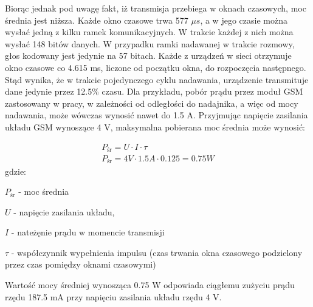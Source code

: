 Biorąc jednak pod uwagę fakt, iż transmisja przebiega w oknach czasowych, moc średnia jest niższa. Każde okno czasowe trwa 577 $\mu s$, a w jego czasie można wysłać jedną z kilku ramek komunikacyjnych. W trakcie każdej z nich można wysłać 148 bitów danych. W przypadku ramki nadawanej w trakcie rozmowy, głos kodowany jest jedynie na 57 bitach. Każde z urządzeń w sieci otrzymuje okno czasowe co 4.615 ms, liczone od początku okna, do rozpoczęcia następnego. Stąd wynika, że w trakcie pojedynczego cyklu nadawania, urządzenie transmituje dane jedynie przez 12.5\% czasu. Dla przykładu, pobór prądu przez moduł GSM zastosowany w pracy, w zależności od odległości do nadajnika, a więc od mocy nadawania, może wówczas wynosić nawet do 1.5 A. Przyjmując napięcie zasilania układu GSM wynoszące 4 V, maksymalna pobierana moc średnia może wynosić:

\begin{gather}
 	P_{\text{śr}} = U \cdot I \cdot \tau \\
 	P_{\text{śr}} = 4 V \cdot 1.5 A \cdot 0.125 = 0.75 W \nonumber 	
 	\label{eq_gsm_power_mean} 
\end{gather}
 gdzie:
 
 $P_{\text{śr}} $ - moc średnia
 
 $U$ - napięcie zasilania układu,
 
 $I$ - nateżęnie prądu w momencie transmisji
 
 $\tau$ - współczynnik wypełnienia impulsu (czas trwania okna czasowego podzielony przez czas pomiędzy oknami czasowymi)
 
Wartość mocy średniej wynosząca 0.75 W odpowiada ciągłemu zużyciu prądu rzędu 187.5 mA przy napięciu zasilania układu rzędu 4 V. 


